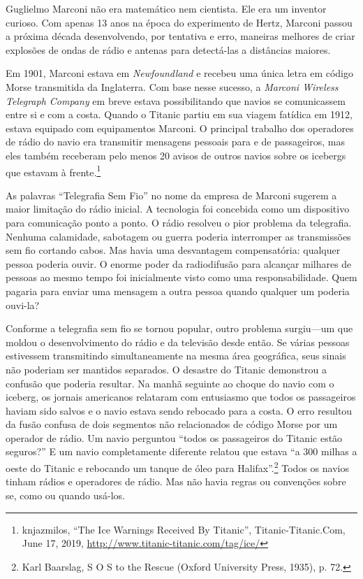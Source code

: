 \documentclass{book}
\newcommand{\ingles}[1]{\textit{#1}}
\begin{document}
Guglielmo Marconi não era matemático nem cientista. Ele era um inventor curioso.
Com apenas 13 anos na época do experimento de Hertz, Marconi passou a próxima
década desenvolvendo, por tentativa e erro, maneiras melhores de criar explosões
de ondas de rádio e antenas para detectá-las a distâncias maiores.

Em 1901, Marconi estava em \ingles{Newfoundland} e recebeu uma única letra em
código Morse transmitida da Inglaterra. Com base nesse sucesso, a \ingles{Marconi
Wireless Telegraph Company} em breve estava possibilitando que navios se
comunicassem entre si e com a costa. Quando o Titanic partiu em sua viagem
fatídica em 1912, estava equipado com equipamentos Marconi. O principal trabalho
dos operadores de rádio do navio era transmitir mensagens pessoais para e de
passageiros, mas eles também receberam pelo menos 20 avisos de outros navios sobre
os icebergs que estavam à frente.\footnote{knjazmilos, ``The Ice Warnings Received
By Titanic'', Titanic-Titanic.Com, June 17, 2019,
\url{http://www.titanic-titanic.com/tag/ice/}}

As palavras ``Telegrafia Sem Fio'' no nome da empresa de Marconi sugerem a maior
limitação do rádio inicial. A tecnologia foi concebida como um dispositivo para
comunicação ponto a ponto. O rádio resolveu o pior problema da telegrafia. Nenhuma
calamidade, sabotagem ou guerra poderia interromper as transmissões sem fio
cortando cabos. Mas havia uma desvantagem compensatória: qualquer pessoa poderia
ouvir. O enorme poder da radiodifusão para alcançar milhares de pessoas ao mesmo
tempo foi inicialmente visto como uma responsabilidade. Quem pagaria para enviar
uma mensagem a outra pessoa quando qualquer um poderia ouvi-la?

Conforme a telegrafia sem fio se tornou popular, outro problema surgiu---um que
moldou o desenvolvimento do rádio e da televisão desde então. Se várias pessoas
estivessem transmitindo simultaneamente na mesma área geográfica, seus sinais não
poderiam ser mantidos separados. O desastre do Titanic demonstrou a confusão que
poderia resultar. Na manhã seguinte ao choque do navio com o iceberg, os jornais
americanos relataram com entusiasmo que todos os passageiros haviam sido salvos
e o navio estava sendo rebocado para a costa. O erro resultou da fusão confusa de
dois segmentos não relacionados de código Morse por um operador de rádio. Um navio
perguntou ``todos os passageiros do Titanic estão seguros?'' E um navio
completamente diferente relatou que estava ``a 300 milhas a oeste do Titanic e
rebocando um tanque de óleo para Halifax''.\footnote{Karl Baarslag, S O S to the
Rescue (Oxford University Press, 1935), p. 72.} Todos os navios tinham rádios e
operadores de rádio. Mas não havia regras ou convenções sobre se, como ou quando
usá-los.
\end{document}
